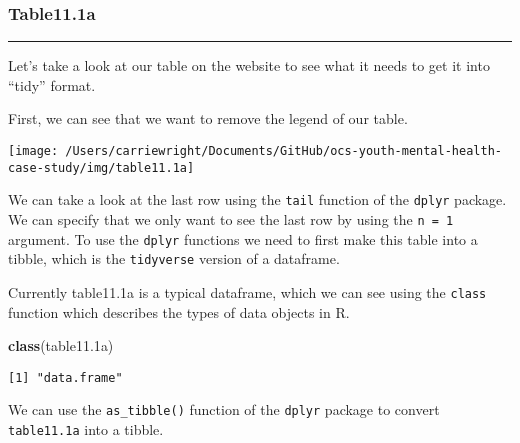 \documentclass[
]{article}
\newenvironment{Shaded}{\begin{snugshade}}{\end{snugshade}}
\newcommand{\DataTypeTok}[1]{\textcolor[rgb]{0.13,0.29,0.53}{#1}}
\newcommand{\DecValTok}[1]{\textcolor[rgb]{0.00,0.00,0.81}{#1}}
\newcommand{\FloatTok}[1]{\textcolor[rgb]{0.00,0.00,0.81}{#1}}
\newcommand{\KeywordTok}[1]{\textcolor[rgb]{0.13,0.29,0.53}{\textbf{#1}}}
\newcommand{\NormalTok}[1]{#1}
\newcommand{\OperatorTok}[1]{\textcolor[rgb]{0.81,0.36,0.00}{\textbf{#1}}}
\newcommand{\StringTok}[1]{\textcolor[rgb]{0.31,0.60,0.02}{#1}}
\begin{document}
\hypertarget{table11.1a}{%
\subsubsection{\texorpdfstring{\textbf{Table11.1a}}{Table11.1a}}\label{table11.1a}}

\begin{center}\rule{0.5\linewidth}{0.5pt}\end{center}

Let's take a look at our table on the website to see what it needs to
get it into ``tidy'' format.

First, we can see that we want to remove the legend of our table.

\begin{center}\texttt{[image: /Users/carriewright/Documents/GitHub/ocs-youth-mental-health-case-study/img/table11.1a]} \end{center}

We can take a look at the last row using the \texttt{tail} function of
the \texttt{dplyr} package. We can specify that we only want to see the
last row by using the \texttt{n\ =\ 1} argument. To use the
\texttt{dplyr} functions we need to first make this table into a tibble,
which is the \texttt{tidyverse} version of a dataframe.

Currently table11.1a is a typical dataframe, which we can see using the
\texttt{class} function which describes the types of data objects in R.

\begin{Shaded}
\begin{Highlighting}[]
\KeywordTok{class}\NormalTok{(table11}\FloatTok{.1}\NormalTok{a)}
\end{Highlighting}
\end{Shaded}

\begin{verbatim}
[1] "data.frame"
\end{verbatim}

We can use the \texttt{as\_tibble()} function of the \texttt{dplyr}
package to convert \texttt{table11.1a} into a tibble.

\begin{Shaded}
\end{Shaded}
\end{document}
